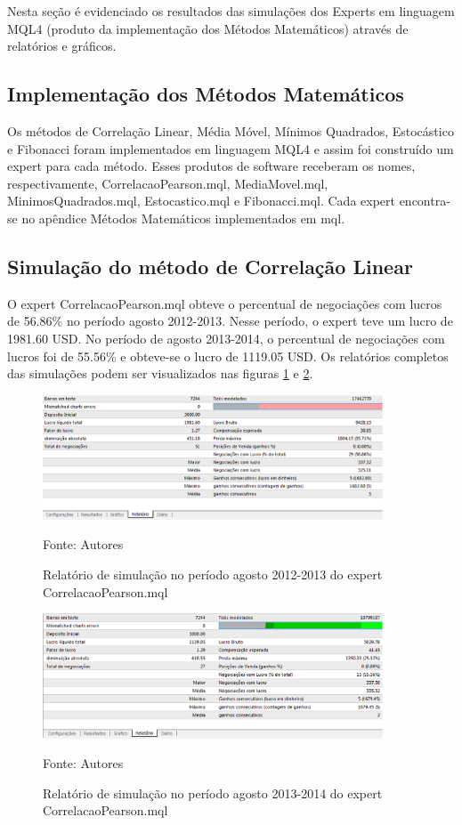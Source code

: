 Nesta seção é evidenciado os resultados  das simulações dos Experts em linguagem MQL4 (produto da implementação dos Métodos Matemáticos) através de relatórios e gráficos.

\subsection{Implementação dos Métodos Matemáticos}

Os métodos de Correlação Linear, Média Móvel, Mínimos Quadrados, Estocástico e Fibonacci foram implementados em linguagem MQL4 e assim foi construído um expert para cada método. Esses produtos de software receberam os nomes, respectivamente, CorrelacaoPearson.mql, MediaMovel.mql, MinimosQuadrados.mql, Estocastico.mql e Fibonacci.mql. Cada expert encontra-se no apêndice Métodos Matemáticos implementados em mql.

\subsection{Simulação do método de Correlação Linear}

O expert CorrelacaoPearson.mql obteve o percentual de negociações com lucros de 56.86\% no período agosto 2012-2013. Nesse período, o expert teve um lucro de 1981.60 USD.
 No período de agosto 2013-2014, o percentual de negociações com lucros foi de 55.56\%  e obteve-se o lucro de 1119.05 USD. 
Os relatórios completos das simulações podem ser visualizados nas figuras \ref{protocoloCorrelacao} e \ref{protocoloCorrelacao2}.

\begin{figure}[htp]
\centering
\includegraphics[width=0.9\textwidth]{figuras/protocoloCorrelacao}
\caption{Relatório de simulação no período agosto 2012-2013 do expert CorrelacaoPearson.mql}{Fonte: Autores} 
\label{protocoloCorrelacao}
\end{figure}

\begin{figure}[htp]
\centering

\includegraphics[width=0.9\textwidth]{figuras/protocoloCorrelacao2}
\caption{Relatório de simulação no período agosto 2013-2014 do expert CorrelacaoPearson.mql}{Fonte: Autores} 
\label{protocoloCorrelacao2}
\end{figure}

